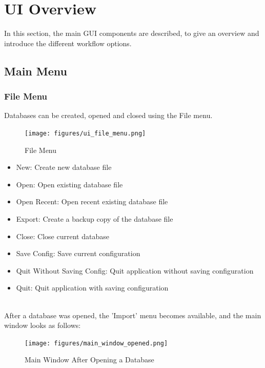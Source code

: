 \chapter{UI Overview}
\label{sec:ui_overview}

In this section, the main GUI components are described, to give an overview and introduce the different workflow options.



\section{Main Menu}

\subsection{File Menu}
\label{sec:ui_overview_file_menu}

Databases can be created, opened and closed using the File menu.

\begin{figure}[H]
  \center
    \texttt{[image: figures/ui\_file\_menu.png]}
  \caption{File Menu}
\end{figure}

\begin{itemize}
 \item New: Create new database file
 \item Open: Open existing database file
 \item Open Recent: Open recent existing database file
 \item Export: Create a backup copy of the database file
 \item Close: Close current database
 \item Save Config: Save current configuration
 \item Quit Without Saving Config: Quit application without saving configuration
 \item Quit: Quit application with saving configuration
\end{itemize}
\  \\

After a database was opened, the 'Import' menu becomes available, and the main window looks as follows:

\begin{figure}[H]
  \hspace*{-2.5cm}
    \texttt{[image: figures/main\_window\_opened.png]}
  \caption{Main Window After Opening a Database}
\end{figure}

